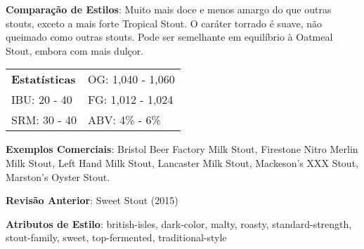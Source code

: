 \textbf{Comparação de Estilos}: Muito mais doce e menos amargo do que outras stouts, exceto a mais forte Tropical Stout. O caráter torrado é suave, não queimado como outras stouts. Pode ser semelhante em equilíbrio à Oatmeal Stout, embora com mais dulçor.

\begin{tabular}{@{}p{35mm}p{35mm}@{}}
  \textbf{Estatísticas} & OG: 1,040 - 1,060 \\
  IBU: 20 - 40  & FG: 1,012 - 1,024 \\
  SRM: 30 - 40  & ABV: 4\% - 6\%
\end{tabular}

\textbf{Exemplos Comerciais}: Bristol Beer Factory Milk Stout, Firestone Nitro Merlin Milk Stout, Left Hand Milk Stout, Lancaster Milk Stout, Mackeson's XXX Stout, Marston’s Oyster Stout.

\textbf{Revisão Anterior}: Sweet Stout (2015)

\textbf{Atributos de Estilo}: british-isles, dark-color, malty, roasty, standard-strength, stout-family, sweet, top-fermented, traditional-style
